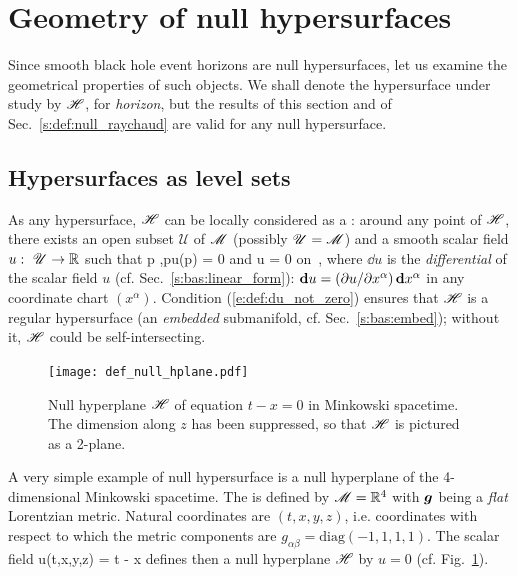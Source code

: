 \section{Geometry of null hypersurfaces} \label{s:def:geom_null_hypsurf}

Since smooth black hole event horizons are null hypersurfaces,
let us examine the geometrical properties of such objects. We shall
denote the hypersurface under study by $\mathscr{H}$, for \emph{horizon}, but the results of this section
and of Sec.~\ref{s:def:null_raychaud} are valid for any null hypersurface.

\subsection{Hypersurfaces as level sets} \label{s:def:hypsurf_level}

As any hypersurface, $\mathscr{H}$ can be locally considered as a :
around any point of $\mathscr{H}$, there exists an open subset $\mathscr{U}$
of $\mathscr{M}$ (possibly  $\mathscr{U} = \mathscr{M}$) and
a smooth scalar field $u:\ \mathscr{U} \rightarrow \mathbb{R}$ such that
\be \label{e:def:Hor_u_zero}
    \forall p \in {},\quad p\in \Hor \iff u(p) = 0
\ee
and
\be \label{e:def:du_not_zero}
    \dd u \not = 0 \quad \mbox{on}\ \Hor ,
\ee
where  $\dd u$ is the \emph{differential} of the scalar field $u$
(cf. Sec.~\ref{s:bas:linear_form}): $\mathbf{d} u = ({\partial u}/{\partial x^\alpha}) \, \mathbf{d} x^\alpha$
in any coordinate chart $(x^\alpha)$.
Condition (\ref{e:def:du_not_zero}) ensures that $\mathscr{H}$ is a regular
hypersurface (an \emph{embedded} submanifold, cf. Sec.~\ref{s:bas:embed}); without it, $\mathscr{H}$ could be
self-intersecting.

\begin{figure}
\centerline{\texttt{[image: def\_null\_hplane.pdf]}}
\caption[]{\label{f:def:null_hplane} \footnotesize
Null hyperplane $\mathscr{H}$ of equation $t-x=0$ in Minkowski spacetime.
The dimension along $z$ has been suppressed, so that $\mathscr{H}$ is pictured as a
2-plane.}
\end{figure}


\begin{example} \label{x:def:null_hyp}
A very simple example of null hypersurface is a null hyperplane of
the 4-dimensional Minkowski spacetime. The  is defined by $\mathscr{M}=\mathbb{R}^4$ with $\bm{g}$ being a \emph{flat} Lorentzian
metric. Natural coordinates are  $(t,x,y,z)$,
i.e. coordinates with
respect to which the metric components are $g_{\alpha\beta} = \mathrm{diag}(-1,1,1,1)$. The scalar field
\be \label{e:def:null_plane_u}
    u(t,x,y,z) = t - x
\ee
defines then a null hyperplane $\mathscr{H}$ by $u=0$ (cf. Fig.~\ref{f:def:null_hplane}).
\end{example}

